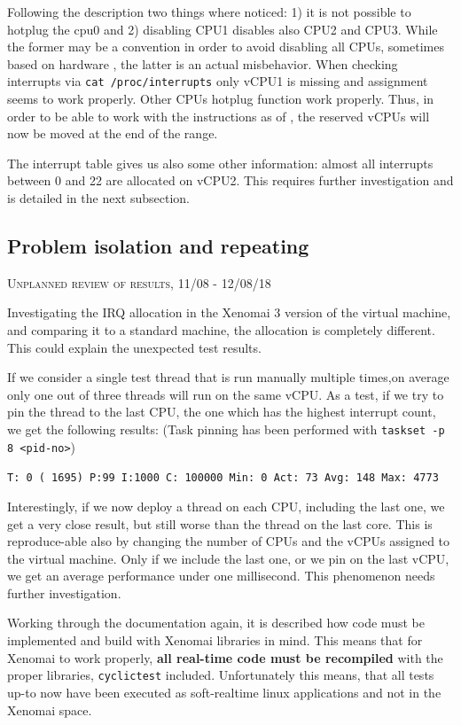 \documentclass[]{scrartcl}
\begin{document}
Following the description two things where noticed: 1) it is not possible to hotplug the cpu0 and 2) disabling CPU1 disables also CPU2 and CPU3.
While the former may be a convention in order to avoid disabling all CPUs, sometimes based on hardware \cite{lwn01}, the latter is an actual misbehavior. 
When checking interrupts via \texttt{cat /proc/interrupts} only vCPU1 is missing and assignment seems to work properly. Other CPUs hotplug function work properly. 
Thus, in order to be able to work with the instructions as of \cite{lwn01}, the reserved vCPUs will now be moved at the end of the range. 

The interrupt table gives us also some other information: almost all interrupts between 0 and 22 are allocated on vCPU2. This requires further investigation and is detailed in the next subsection.

\subsection{Problem isolation and repeating}
\label{sec:isol}

{\small\textsc{Unplanned review of results, 11/08 - 12/08/18} \bigskip}

Investigating the IRQ allocation in the Xenomai 3 version of the virtual machine, and comparing it to a standard machine, the allocation is completely different. This could explain the unexpected test results.

If we consider a single test thread that is run manually multiple times,on average only one out of three threads will run on the same vCPU.
As a test, if we try to pin the thread to the last CPU, the one which has the highest interrupt count, we get the following results: (Task pinning has been performed with \texttt{taskset -p 8 <pid-no>})

\bigskip

\noindent \small \texttt{T: 0 ( 1695) P:99 I:1000 C: 100000 Min:      0 Act:   73 Avg:  148 Max:    4773}

Interestingly, if we now deploy a thread on each CPU, including the last one, we get a very close result, but still worse than the thread on the last core.
This is reproduce-able also by changing the number of CPUs and the vCPUs assigned to the virtual machine. 
Only if we include the last one, or we pin on the last vCPU, we get an average performance under one millisecond. This phenomenon needs further investigation.

Working through the documentation again, it is described how code must be implemented and build with Xenomai libraries in mind. 
This means that for Xenomai to work properly, \textbf{all real-time code must be recompiled} with the proper libraries, \texttt{cyclictest} included.
Unfortunately this means, that all tests up-to now have been executed as soft-realtime linux applications and not in the Xenomai space.
\end{document}
